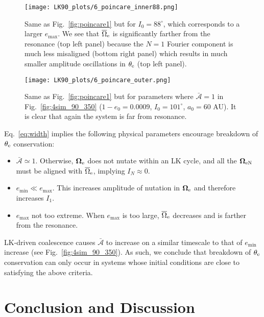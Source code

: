 \documentclass[
        twocolumn,
        twocolappendix
    ]{aastex63}
\renewcommand*{\bm}[1]{\boldsymbol{\mathbf{#1}}}
\begin{document}
\begin{figure}
    \centering
    \texttt{[image: LK90\_plots/6\_poincare\_inner88.png]}
    \caption{Same as Fig.~\ref{fig:poincare1} but for $I_0 = 88^\circ$, which
    corresponds to a larger $e_{\max}$. We see that
    $\overline{\Omega}_{\rm e}$ is significantly farther from the resonance (top
    left panel) because the $N = 1$ Fourier component is much less misaligned
    (bottom right panel) which results in much smaller amplitude oscillations in
    $\theta_{\rm e}$ (top left panel).}\label{fig:poincare2}
\end{figure}
\begin{figure}
    \centering
    \texttt{[image: LK90\_plots/6\_poincare\_outer.png]}
    \caption{Same as Fig.~\ref{fig:poincare1} but for parameters where
    $\bar{\mathcal{A}} = 1$ in Fig.~\ref{fig:4sim_90_350} ($1 - e_0 = 0.0009$,
    $I_0 = 101^\circ$, $a_0 = 60$ AU). It is clear that again the system is far
    from resonance.}\label{fig:poincare_out}
\end{figure}

Eq.~\eqref{eq:width} implies the following physical parameters encourage
breakdown of $\theta_{\rm e}$ conservation:
\begin{itemize}
    \item $\bar{\mathcal{A}} \simeq 1$. Otherwise, $\bm{\Omega}_{\rm
        e}$ does not nutate within an LK cycle, and all the $\bm{\Omega}_{\rm
        eN}$ must be aligned with $\overline{\Omega}_{\rm e}$, implying $I_N
        \approx 0$.

    \item $e_{\min} \ll e_{\max}$. This increases amplitude of nutation in
        $\bm{\Omega}_{\rm e}$ and therefore increases $I_1$.

    \item $e_{\max}$ not too extreme. When $e_{\max}$ is too large,
        $\overline{\Omega}_{\rm e}$ decreases and is farther from the resonance.
\end{itemize}

LK-driven coalescence causes $\bar{\mathcal{A}}$ to increase on a similar
timescale to that of $e_{\min}$ increase (see Fig.~\ref{fig:4sim_90_350}). As
such, we conclude that breakdown of $\theta_{\rm e}$ conservation can only occur
in systems whose initial conditions are close to satisfying the above criteria.

\section{Conclusion and Discussion}\label{s:discussion}
\end{document}
